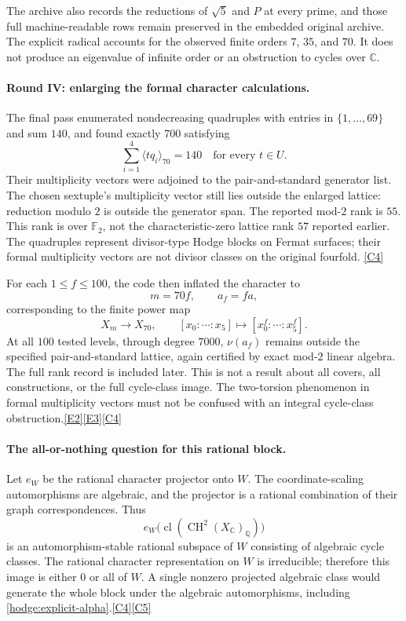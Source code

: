 \documentclass[11pt]{article}
\newcommand{\Q}{\mathbb Q}
\newcommand{\C}{\mathbb C}
\newcommand{\F}{\mathbb F}
\newcommand{\cl}{\operatorname{cl}}
\newcommand{\CH}{\operatorname{CH}}
\newcommand{\src}[1]{\hyperlink{src:#1}{[#1]}}
\begin{document}
\endgroup

The archive also records the reductions of $\sqrt5$ and $P$ at every prime,
and those full machine-readable rows remain preserved in the embedded
original archive. The explicit radical accounts for the observed finite
orders $7$, $35$, and $70$. It does not produce an eigenvalue of infinite
order or an obstruction to cycles over $\C$.

\paragraph{Round IV: enlarging the formal character calculations.}
The final pass enumerated nondecreasing quadruples with entries in
$\{1,\ldots,69\}$ and sum $140$, and found exactly $700$ satisfying
\[
 \sum_{i=1}^{4}\langle tq_i\rangle_{70}=140
 \quad\text{for every }t\in U.
\]
Their multiplicity vectors were adjoined to the pair-and-standard generator
list. The chosen sextuple's multiplicity vector still lies outside the
enlarged lattice: reduction modulo $2$ is outside the generator span. The
reported mod-$2$ rank is $55$. This rank is over $\F_2$, not the
characteristic-zero lattice rank $57$ reported earlier. The quadruples
represent divisor-type Hodge blocks on Fermat surfaces; their formal
multiplicity vectors are not divisor classes on the original fourfold.
\src{C4}

For each $1\le f\le100$, the code then inflated the character to
\[
 m=70f,\qquad a_f=fa,
\]
corresponding to the finite power map
\[
 X_m\longrightarrow X_{70},\qquad
 [x_0:\cdots:x_5]\longmapsto[x_0^f:\cdots:x_5^f].
\]
At all $100$ tested levels, through degree $7000$, $\nu(a_f)$ remains
outside the specified pair-and-standard lattice, again certified by exact
mod-$2$ linear algebra. The full rank record is included later. This is not
a result about all covers, all constructions, or the full cycle-class image.
The two-torsion phenomenon in formal multiplicity vectors must not be
confused with an integral cycle-class obstruction.\src{E2}\src{E3}\src{C4}

\paragraph{The all-or-nothing question for this rational block.}
Let $e_W$ be the rational character projector onto $W$. The coordinate-scaling
automorphisms are algebraic, and the projector is a rational combination of
their graph correspondences. Thus
\[
 e_W\bigl(\cl(\CH^2(X_{\C})_{\Q})\bigr)
\]
is an automorphism-stable rational subspace of $W$ consisting of algebraic
cycle classes. The rational character representation on $W$ is irreducible;
therefore this image is either $0$ or all of $W$. A single nonzero projected
algebraic class would generate the whole block under the algebraic
automorphisms, including \eqref{hodge:explicit-alpha}.\src{C4}\src{C5}
\end{document}
